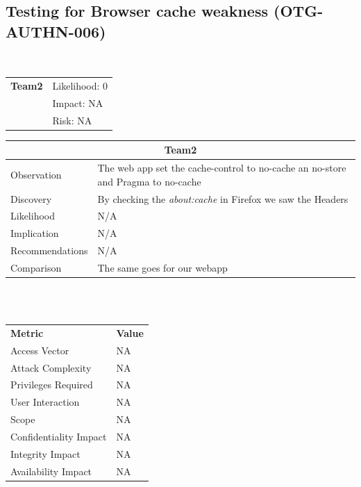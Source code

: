\documentclass[headsepline,footsepline,footinclude=false,oneside,fontsize=11pt,paper=a4,listof=totoc,bibliography=totoc]{scrbook} %
\begin{document}
\pagebreak
\subsection{Testing for Browser cache weakness (OTG-AUTHN-006)}\

\begin{tabular}{cR{12cm}}
	\textbf{Team2} & Likelihood: 0\\& Impact: NA\\& Risk: NA
\end{tabular}

\begin{tabular}{ l|p{11cm}  }
	\hline
	\multicolumn{2}{c}{\textbf{Team2}} \\
	\hline
	Observation & The web app set the cache-control to no-cache an no-store and Pragma to no-cache\\
	Discovery & By checking the \textit{about:cache} in Firefox we saw the Headers\\
	Likelihood &  N/A \\
	Implication & N/A \\
	Recommendations &  N/A\\
	Comparison & The same goes for our webapp \\
	\hline
\end{tabular}
\\
\vspace{0.5cm}
\\
\begin{center}
	\begin{tabular}{ll}
		\rowcolor[HTML]{34CDF9}
		{\color[HTML]{ECF4FF} \textbf{Metric}}        & {\color[HTML]{ECF4FF} \textbf{Value}} \\
		\rowcolor[HTML]{BBDAFF}
		{\color[HTML]{333333} Access Vector}          & {\color[HTML]{333333} } NA              \\
		\rowcolor[HTML]{ECF4FF}
		{\color[HTML]{333333} Attack Complexity}      & {\color[HTML]{333333} } NA              \\
		\rowcolor[HTML]{BBDAFF}
		{\color[HTML]{333333} Privileges Required}    & {\color[HTML]{333333} } NA              \\
		\rowcolor[HTML]{ECF4FF}
		{\color[HTML]{333333} User Interaction}       & {\color[HTML]{333333} } NA              \\
		\rowcolor[HTML]{BBDAFF}
		{\color[HTML]{333333} Scope}                  & {\color[HTML]{333333} } NA              \\
		\rowcolor[HTML]{ECF4FF}
		{\color[HTML]{333333} Confidentiality Impact} & {\color[HTML]{333333} } NA              \\
		\rowcolor[HTML]{BBDAFF}
		{\color[HTML]{333333} Integrity Impact}       & {\color[HTML]{333333} } NA              \\
		\rowcolor[HTML]{ECF4FF}
		{\color[HTML]{333333} Availability Impact}    & {\color[HTML]{333333} } NA
	\end{tabular}
\end{center}
\end{document}

